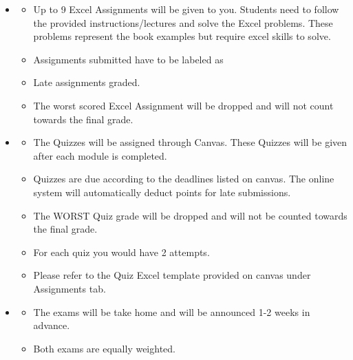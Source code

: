 \documentclass[letterpaper]{inzane_syllabus} %
\begin{document}
\begin{itemize}[label= \color{myCOLOR}{$\RHD$}]

   \item \textbf{\color{myCOLOR}{Excel Assignments (Individual)}} 
        \begin{itemize}[label= \color{myCOLOR}{$\circ$}]
            \item	Up to 9 Excel Assignments will be given to you. Students need to follow the provided  instructions/lectures and solve the Excel problems. These problems represent the book examples but require excel skills to solve.
            \item Assignments submitted have to be labeled as \textbf{\color{myCOLOR}{"IE4512 - HW \# <Student Name>"}}
            \item Late assignments \textit{\color{red}{will not be}} graded. 
            \item The worst scored  Excel Assignment will be dropped and will not count towards the final grade.
        \end{itemize}
        
        \item \textbf{\color{myCOLOR}{Quizzes (Individual)}} 
        \begin{itemize}[label= \color{myCOLOR}{$\circ$}]
            \item The Quizzes will be assigned through Canvas. These Quizzes will be given after each module is completed.
            \item Quizzes are due according to the deadlines listed on canvas. The online system will automatically deduct points for late submissions.
            \item The WORST Quiz grade will be dropped and will not be counted towards the final grade.
            \item For each quiz you would have 2 attempts. 
            \item Please refer to the Quiz Excel template provided on canvas under Assignments tab.
        \end{itemize}
        
       \item \textbf{\color{myCOLOR}{Exams: Mini Exam 1  and Mini Exam 2 (Individual)}} 
        \begin{itemize}[label= \color{myCOLOR}{$\circ$}]
           
            \item The exams will be take home and will be announced 1-2 weeks in advance.
            \item Both exams are equally weighted.
        \end{itemize}
        

\end{itemize}
\end{document}
